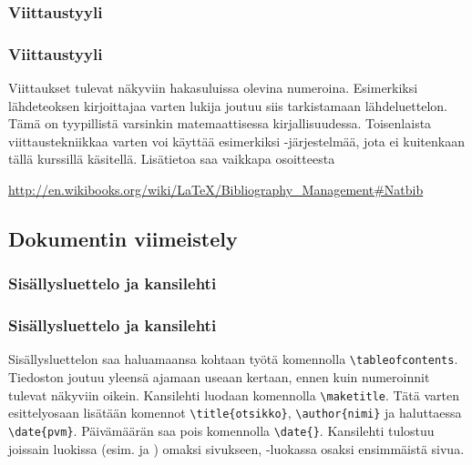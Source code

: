 \subsubsection{Viittaustyyli}
\begin{frame}[fragile]
    \frametitle{Viittaustyyli}
    Viittaukset tulevat näkyviin hakasuluissa olevina numeroina. Esimerkiksi lähdeteoksen kirjoittajaa varten lukija joutuu siis tarkistamaan lähdeluettelon. Tämä on tyypillistä varsinkin matemaattisessa kirjallisuudessa. 
    \vaihto
    Toisenlaista viittaustekniikkaa varten voi käyttää esimerkiksi -järjestelmää, jota ei kuitenkaan tällä kurssillä käsitellä. Lisätietoa saa vaikkapa osoitteesta
    \begin{scriptsize}
        \url{http://en.wikibooks.org/wiki/LaTeX/Bibliography_Management#Natbib}
    \end{scriptsize}
\end{frame}


\subsection{Dokumentin viimeistely}

\subsubsection{Sisällysluettelo ja kansilehti}
\begin{frame}[fragile]
    \frametitle{Sisällysluettelo ja kansilehti}
    Sisällysluettelon saa haluamaansa kohtaan työtä komennolla \lstinline-\tableofcontents-. Tiedoston joutuu yleensä ajamaan useaan kertaan, ennen kuin numeroinnit tulevat näkyviin oikein.
    \vaihto
    Kansilehti luodaan komennolla \lstinline-\maketitle-. Tätä varten esittelyosaan lisätään komennot \lstinline-\title{otsikko}-, \lstinline-\author{nimi}- ja haluttaessa \lstinline-\date{pvm}-. Päivämäärän saa pois komennolla \lstinline-\date{}-.
    \vaihto
    Kansilehti tulostuu joissain luokissa (esim.  ja ) omaksi sivukseen, -luokassa osaksi ensimmäistä sivua.
\end{frame}

\begin{frame}[fragile]
    
    
\end{frame}


